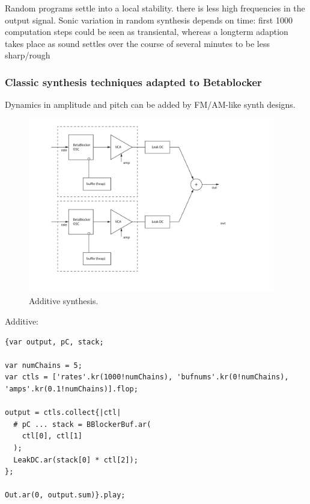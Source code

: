 \documentclass[letterpaper, 12pt]{article}
\begin{document}
Random programs settle into a local stability. there is less high frequencies in the output signal. 
Sonic variation in random synthesis depends on time: 
first 1000 computation steps could be seen as transiental, whereas a longterm adaption takes place as sound settles over the course of several minutes to be less sharp/rough

\subsubsection{Classic synthesis techniques adapted to Betablocker} %
\label{sub:classic_synthesis_techniques_adapted_to_betablocker}

Dynamics in amplitude and pitch can be added by FM/AM-like synth designs.

\begin{figure}
	\centering
		\includegraphics[height=3in]{Additive-Betablocker}
	\caption{Additive synthesis.}
	\label{fig:fig_Additive-Betablocker}
\end{figure}


Additive:
\begin{Verbatim}[fontfamily=courier, xleftmargin=\parindent]
{var output, pC, stack;

var numChains = 5;
var ctls = ['rates'.kr(1000!numChains), 'bufnums'.kr(0!numChains), 'amps'.kr(0.1!numChains)].flop;

output = ctls.collect{|ctl|
  # pC ... stack = BBlockerBuf.ar(
    ctl[0], ctl[1]
  );
  LeakDC.ar(stack[0] * ctl[2]);
};

Out.ar(0, output.sum)}.play;
\end{Verbatim}
\end{document}

